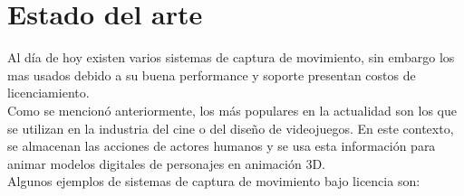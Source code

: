 \section{Estado del arte}

Al día de hoy existen varios sistemas de captura de movimiento, sin embargo los mas usados debido a su buena performance y soporte presentan costos de licenciamiento. 
\\ 

Como se mencionó anteriormente, los más populares en la actualidad son los que se utilizan en la industria del cine o del diseño de videojuegos. En este contexto, se almacenan las acciones de actores humanos y se usa esta información para animar modelos digitales de personajes en animación 3D.
\\ 

Algunos ejemplos de sistemas de captura de movimiento bajo licencia son:

